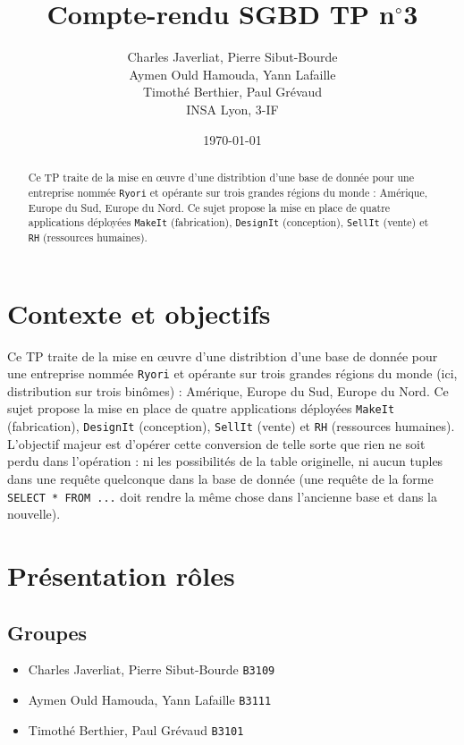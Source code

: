 \documentclass[10pt,a4paper]{article}
\title{Compte-rendu SGBD TP n$^\circ$3}
\author{
Charles Javerliat, Pierre Sibut-Bourde\\
Aymen Ould Hamouda, Yann Lafaille\\
Timothé Berthier, Paul Grévaud\\
\small INSA Lyon, 3-IF
}
\date{\today}
\theoremstyle{plain}
\begin{document}
\maketitle
\begin{abstract}
    Ce TP traite de la mise en \oe uvre d'une distribtion d'une base de donnée pour une entreprise nommée \verb|Ryori| et opérante sur trois grandes régions du monde : Amérique, Europe du Sud, Europe du Nord. Ce sujet propose la mise en place de quatre applications déployées \verb|MakeIt| (fabrication), \verb|DesignIt| (conception), \verb|SellIt| (vente) et \verb|RH| (ressources humaines).
\end{abstract}

\tableofcontents
\newpage

\section{Contexte et objectifs}
Ce TP traite de la mise en \oe uvre d'une distribtion d'une base de donnée pour une entreprise nommée \verb|Ryori| et opérante sur trois grandes régions du monde (ici, distribution sur trois binômes) : Amérique, Europe du Sud, Europe du Nord. Ce sujet propose la mise en place de quatre applications déployées \verb|MakeIt| (fabrication), \verb|DesignIt| (conception), \verb|SellIt| (vente) et \verb|RH| (ressources humaines). L'objectif majeur est d'opérer cette conversion de telle sorte que rien ne soit perdu dans l'opération : ni les possibilités de la table originelle, ni aucun tuples dans une requête quelconque dans la base de donnée (une requête de la forme \verb|SELECT * FROM ...| doit rendre la même chose dans l'ancienne base et dans la nouvelle).

\section{Présentation rôles}
\subsection{Groupes}
\begin{itemize}
    \item Charles Javerliat, Pierre Sibut-Bourde \verb|B3109|
    \item Aymen Ould Hamouda, Yann Lafaille \verb|B3111|
    \item Timothé Berthier, Paul Grévaud \verb|B3101|
\end{itemize}
\end{document}

